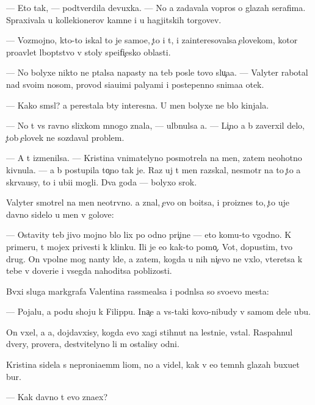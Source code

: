 \documentclass[10pt]{book}
\begin{document}
— Eto tak, — podtverdila devuxka. — No {\y}a zadavala vopros{\yi} o glazah serafima. Spraxivala u kollek{\q}ionerov kamne{\y} i u hagjitskih torgov{\q}ev.

— Vozmojno, kto-to iskal to je samo{\y}e, {\c}to i t{\yi}, i za{\y}interesovalsa {\c}elovekom, kotor{\yi}{\y} pro{\y}avl{\ia}{\y}et l{\iu}bop{\yi}tstvo v stoly spe{\q}ifi{\c}esko{\y} oblasti.

— No bolyxe nikto ne p{\yi}talsa napasty na teb{\ia} posle tovo slu{\c}a{\y}a. — Valyter rabotal nad svo{\y}im nosom, provod{\ia} si{\y}a{\y}u{\x}imi paly{\q}ami i postepenno snima{\y}a otek.

— Kako{\y} sm{\yi}sl? {\Y}a perestala b{\yi}ty interesna. U men{\ia} bolyxe ne b{\yi}lo kinjala.

— No t{\yi} vs{\e} ravno slixkom mnogo znala, — ul{\yi}bnulsa {\y}a. — Li{\c}no {\y}a b{\yi} zaverxil delo, {\c}tob{\yi} {\c}elovek ne sozdaval problem{\yi}.

— A t{\yi} izmenilsa. — Kristina vnimatelyno posmotrela na men{\ia}, zatem neohotno kivnula. — {\Y}a b{\yi} postupila to{\c}no tak je. Raz uj t{\yi} men{\ia} raz{\yi}skal, nesmotr{\ia} na to {\c}to {\y}a skr{\yi}va{\y}usy, to i ubi{\y}{\q}i mogli. Dva goda — bolyxo{\y} srok.

Valyter smotrel na men{\ia} neotr{\yi}vno. {\Y}a znal, {\c}evo on bo{\y}itsa, i pro{\y}iznes to, {\c}to uje davno sidelo u men{\ia} v golove:

— Ostavity teb{\ia} jivo{\y} mojno b{\yi}lo lix po odno{\y} pri{\c}ine — eto komu-to v{\yi}godno. K primeru, t{\yi} mojex privesti k klinku. Ili je {\y}e{\x}o kak-to pomo{\c}. Vot, dopustim, tvo{\y} drug. On vpolne mog nan{\ia}ty l{\iu}de{\y}, a zatem, kogda u nih ni{\c}evo ne v{\yi}xlo, vteretsa k tebe v doveri{\y}e i vsegda nahoditsa poblizosti.

B{\yi}vxi{\y} sluga markgrafa Valentina rassme{\y}alsa i podn{\ia}lsa so svo{\y}evo mesta:

— Pojalu{\y}, {\y}a po{\y}du shoju k Filippu. Ina{\c}e {\y}a vs{\e}-taki kovo-nibudy v samom dele ub{\y}u.

On v{\yi}xel, a {\y}a, dojdavxisy, kogda {\y}evo xagi stihnut na lestni{\q}e, vstal. Raspahnul dvery, prover{\ia}{\y}a, de{\y}stvitelyno li m{\yi} ostalisy odni.

Kristina sidela s neproni{\q}a{\y}em{\yi}m li{\q}om, no {\y}a videl, kak v {\y}e{\y}o temn{\yi}h glazah buxu{\y}et bur{\ia}.

— Kak davno t{\yi} {\y}evo zna{\y}ex?
\end{document}
